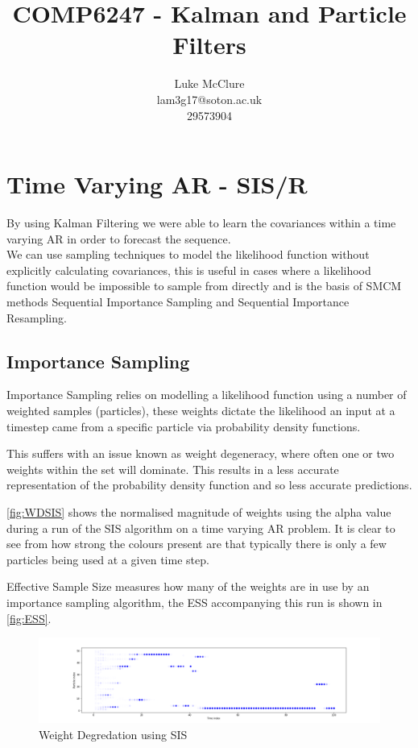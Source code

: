 \documentclass[sigconf]{acmart}
\begin{document}
\title{COMP6247 - Kalman and Particle Filters}
\author{Luke McClure \\ lam3g17@soton.ac.uk \\ 29573904}

\maketitle

\section{Time Varying AR - SIS/R}
\label{section:one}
By using Kalman Filtering we were able to learn the covariances within a time varying AR in order to forecast the sequence.\\

We can use sampling techniques to model the likelihood function without explicitly calculating covariances, this is useful in cases
where a likelihood function would be impossible to sample from directly and is the basis of SMCM methods Sequential Importance Sampling and Sequential Importance Resampling.

\subsection{Importance Sampling}
Importance Sampling relies on modelling a likelihood function using a number of weighted samples (particles), these weights dictate the likelihood an input at a timestep came from a specific particle via probability density functions.

This suffers with an issue known as weight degeneracy, where often one or two weights within the set will dominate. This results in a less accurate representation of the probability density function and so less accurate predictions.

\autoref{fig:WDSIS} shows the normalised magnitude of weights using the alpha value during a run of the SIS algorithm on a time varying AR problem. It is clear to see from how strong the colours present are that typically there is only a few particles being used at a given time step.

Effective Sample Size measures how many of the weights are in use by an importance sampling algorithm, the ESS accompanying this run is shown in \autoref{fig:ESS}.
\begin{figure}[h]
  \centering
  \includegraphics[width=\linewidth]{../Part 1/DegPlot.png}
  \caption{Weight Degredation using SIS}
  \label{fig:WDSIS}
\end{figure}
\end{document}
